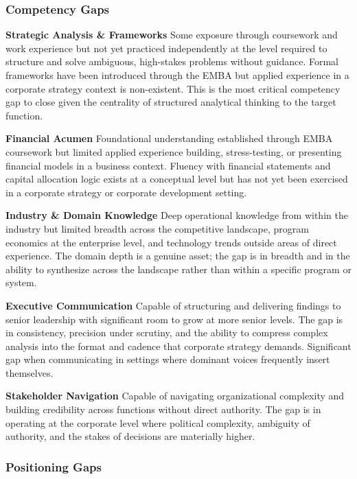 \documentclass{article}
\begin{document}
\subsubsection{Competency Gaps}

\textbf{Strategic Analysis \& Frameworks}
Some exposure through coursework and work experience but not yet practiced independently at the level required to structure and solve
ambiguous, high-stakes problems without guidance. Formal frameworks have been introduced through the EMBA but applied experience in a
corporate strategy context is non-existent. This is the most critical competency gap to close given the centrality of 
structured analytical thinking to the target function.

\textbf{Financial Acumen}
Foundational understanding established through EMBA coursework but limited applied experience building, stress-testing, or presenting
financial models in a business context. Fluency with financial statements and capital allocation logic exists at a conceptual level but
has not yet been exercised in a corporate strategy or corporate development setting.

\textbf{Industry \& Domain Knowledge}
Deep operational knowledge from within the industry but limited breadth across the competitive landscape, program economics at the
enterprise level, and technology trends outside areas of direct experience. The domain depth is a genuine asset; the gap is in breadth
and in the ability to synthesize across the landscape rather than within a specific program or system.

\textbf{Executive Communication}
Capable of structuring and delivering findings to senior leadership with significant room to grow at more senior levels. 
The gap is in consistency, precision under scrutiny, and the ability to compress complex analysis into the format and 
cadence that corporate strategy demands. Significant gap when communicating in settings where dominant voices frequently
insert themselves.

\textbf{Stakeholder Navigation}
Capable of navigating organizational complexity and building credibility across functions without direct authority. The gap is in
operating at the corporate level where political complexity, ambiguity of authority, and the stakes of decisions are 
materially higher.

\subsubsection{Positioning Gaps}
\end{document}

